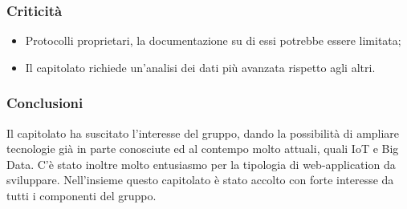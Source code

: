 	\subsubsection{Criticità}
	\begin{itemize}
		\item Protocolli proprietari, la documentazione su di essi potrebbe essere limitata;
		\item Il capitolato richiede un'analisi dei dati più avanzata rispetto agli altri.
	\end{itemize}
	
	\subsubsection{Conclusioni}
	Il capitolato ha suscitato l'interesse del gruppo, dando la possibilità di ampliare tecnologie già in parte conosciute ed al contempo molto attuali, quali IoT e Big Data. C'è stato inoltre molto entusiasmo per la tipologia di web-application da sviluppare. Nell'insieme questo capitolato è stato accolto con forte interesse da tutti i componenti del gruppo.

